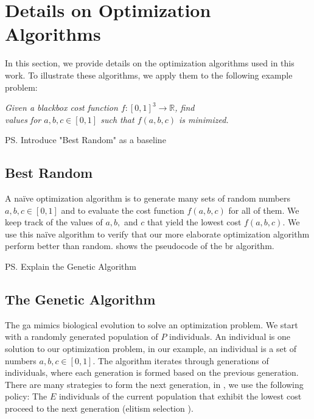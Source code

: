 \section{Details on Optimization Algorithms}
\label{app:opt}


In this section, we provide details on the optimization algorithms used in this work.
To illustrate these algorithms, we apply them to the following example problem:

\begin{center}
\textit{Given a blackbox cost function $f:[0,1]^3 \to \mathbb{R}$, find\\values for $a,b,c \in [0,1]$ such that $f(a,b,c)$ is minimized.}
\end{center}

\ps{Introduce "Best Random" as a baseline}

\subsection{Best Random}
\label{app:opt-br}

A na\"ive optimization algorithm is to generate many sets of random numbers $a,b,c \in [0,1]$ and to evaluate the cost function $f(a,b,c)$ for all of them.
We keep track of the values of $a,b,$ and $c$ that yield the lowest cost $f(a,b,c)$.
We use this na\"ive algorithm to verify that our more elaborate optimization algorithm perform better than random.
 shows the pseudocode of the \gls{br} algorithm.



\ps{Explain the Genetic Algorithm}

\subsection{The Genetic Algorithm}
\label{app:opt-ga}

The \gls{ga} mimics biological evolution to solve an optimization problem.
We start with a randomly generated population of $P$ individuals.
An individual is one solution to our optimization problem, in our example, an individual is a set of numbers $a,b,c \in [0,1]$.
The algorithm iterates through generations of individuals, where each generation is formed based on the previous generation.
There are many strategies to form the next generation, in \name, we use the following policy:
The $E$ individuals of the current population that exhibit the lowest cost proceed to the next generation (elitism selection \cite{ga-elite}).

